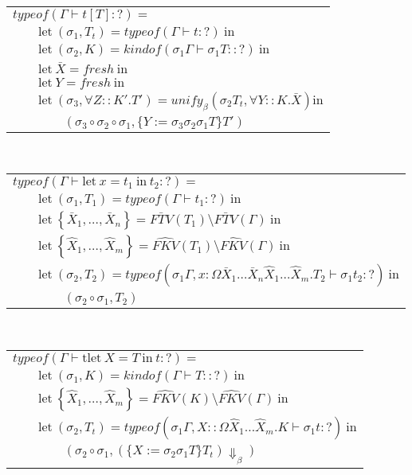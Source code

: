 \documentclass[11pt,leqno]{article}
\begin{document}
\begin{tabular}{l}
$typeof(\Gamma \vdash t[T] : ?) = $ \\
$\qquad \textrm{let} \ (\sigma_1, T_t) = typeof(\Gamma \vdash t : ?) \ \textrm{in} $ \\
$\qquad \textrm{let} \ (\sigma_2, K) = kindof(\sigma_1 \Gamma \vdash \sigma_1 T :: ?) \ \textrm{in} $ \\
$\qquad \textrm{let} \ \bar{X} = fresh \ \textrm{in} $ \\
$\qquad \textrm{let} \ Y = fresh \ \textrm{in} $ \\
$\qquad \textrm{let} \ (\sigma_3, \forall Z :: K' . T') = unify_\beta(\sigma_2 T_t, \forall Y::K.\bar{X}) \textrm{in} $ \\
$\qquad\qquad (\sigma_3 \circ \sigma_2 \circ \sigma_1, \{Y:=\sigma_3 \sigma_2 \sigma_1 T\} T') $ \\
\end{tabular} \\
\begin{tabular}{l}
$typeof(\Gamma \vdash \textrm{let} \ x=t_1 \ \textrm{in} \ t_2 : ?) = $ \\
$\qquad \textrm{let} \ (\sigma_1, T_1) = typeof(\Gamma \vdash t_1 : ?) \ \textrm{in} $ \\
$\qquad \textrm{let} \ \left\{ \bar{X}_1, \dots, \bar{X}_n \right\} = \bar{FTV}(T_1) \setminus \bar{FTV}(\Gamma) \ \textrm{in} $ \\
$\qquad \textrm{let} \ \left\{ \widehat{X}_1, \dots, \widehat{X}_m \right\} = \widehat{FKV}(T_1) \setminus \widehat{FKV}(\Gamma) \ \textrm{in} $ \\
$\qquad \textrm{let} \ (\sigma_2, T_2) = typeof(\sigma_1 \Gamma, x:\Omega \bar{X}_1 \dots \bar{X}_n \widehat{X}_1 \dots \widehat{X}_m. T_2 \vdash \sigma_1 t_2 : ?) \ \textrm{in} $ \\
$\qquad\qquad (\sigma_2 \circ \sigma_1, T_2) $ \\
\end{tabular} \\
\begin{tabular}{l}
$typeof(\Gamma \vdash \textrm{tlet} \ X=T \ \textrm{in} \ t : ?) = $ \\
$\qquad \textrm{let} \ (\sigma_1, K) = kindof(\Gamma \vdash T :: ?) \ \textrm{in} $ \\
$\qquad \textrm{let} \ \left\{ \widehat{X}_1, \dots, \widehat{X}_m \right\} = \widehat{FKV}(K) \setminus \widehat{FKV}(\Gamma) \ \textrm{in} $ \\
$\qquad \textrm{let} \ (\sigma_2, T_t) = typeof(\sigma_1 \Gamma, X::\Omega \widehat{X}_1 \dots \widehat{X}_m.K \vdash \sigma_1 t : ?) \ \textrm{in} $ \\
$\qquad\qquad (\sigma_2 \circ \sigma_1, (\{X := \sigma_2 \sigma_1 T\}T_t) \Downarrow_\beta) $ \\
\end{tabular} \\
\end{document}
